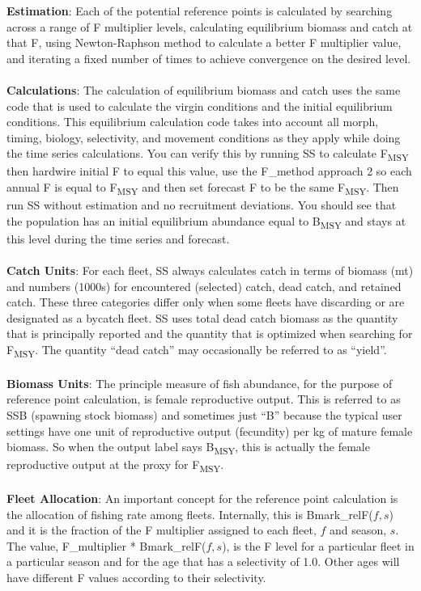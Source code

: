 \noindent \textbf{Estimation}: Each of the potential reference points is calculated by searching across a range of F multiplier levels, calculating equilibrium biomass and catch at that F, using Newton-Raphson method to calculate a better F multiplier value, and iterating a fixed number of times to achieve convergence on the desired level.
\\\\
\noindent \textbf{Calculations}: The calculation of equilibrium biomass and catch uses the same code that is used to calculate the virgin conditions and the initial equilibrium conditions.  This equilibrium calculation code takes into account all morph, timing, biology, selectivity, and movement conditions as they apply while doing the time series calculations.  You can verify this by running SS to calculate F\textsubscript{MSY} then hardwire initial F to equal this value, use the F\_method approach 2 so each annual F is equal to F\textsubscript{MSY} and then set forecast F to be the same F\textsubscript{MSY}.  Then run SS without estimation and no recruitment deviations.  You should see that the population has an initial equilibrium abundance equal to B\textsubscript{MSY} and stays at this level during the time series and forecast.
\\\\
\noindent \textbf{Catch Units}: For each fleet, SS always calculates catch in terms of biomass (mt) and numbers (1000s) for encountered (selected) catch, dead catch, and retained catch.  These three categories differ only when some fleets have discarding or are designated as a bycatch fleet.  SS uses total dead catch biomass as the quantity that is principally reported and the quantity that is optimized when searching for F\textsubscript{MSY}.  The quantity “dead catch” may occasionally be referred to as “yield”.
\\\\
\noindent \textbf{Biomass Units}: The principle measure of fish abundance, for the purpose of reference point calculation, is female reproductive output.  This is referred to as SSB (spawning stock biomass) and sometimes just “B” because the typical user settings have one unit of reproductive output (fecundity) per kg of mature female biomass.  So when the output label says B\textsubscript{MSY}, this is actually the female reproductive output at the proxy for F\textsubscript{MSY}.
\\\\
\noindent \textbf{Fleet Allocation}: An important concept for the reference point calculation is the allocation of fishing rate among fleets.  Internally, this is Bmark\_relF($f,s$) and it is the fraction of the F multiplier assigned to each fleet, $f$ and season, $s$.  The value, F\_multiplier * Bmark\_relF($f,s$), is the F level for a particular fleet in a particular season and for the age that has a selectivity of 1.0.  Other ages will have different F values according to their selectivity.
